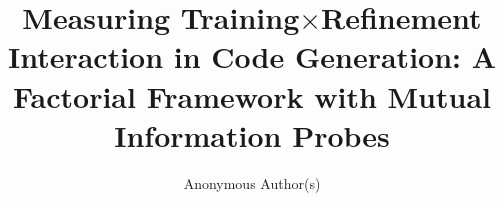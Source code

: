 \documentclass{article}
\title{Measuring Training$\times$Refinement Interaction in Code Generation: A Factorial Framework with Mutual Information Probes}
\author{Anonymous Author(s)}
\begin{document}
\maketitle

\begin{abstract}

\end{abstract}











\end{document}
